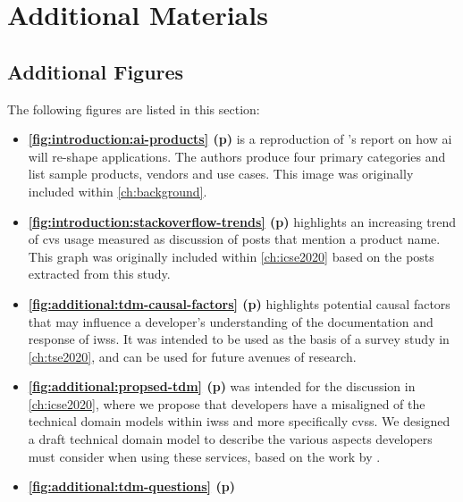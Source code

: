 \chapter{Additional Materials}
\label{ch:additional-materials}

\cleardoublepage



\clearpage

\section{Additional Figures}

The following figures are listed in this section:

\begin{itemize}
\item \textbf{\cref{fig:introduction:ai-products} (p\pageref{fig:introduction:ai-products})}
  is a reproduction of \citet{LoGiudice:2016wf}'s report on how \gls{ai} will re-shape applications. The authors produce four primary categories and list sample products, vendors and use cases. This image was originally included within \cref{ch:background}.
\item \textbf{\cref{fig:introduction:stackoverflow-trends} (p\pageref{fig:introduction:stackoverflow-trends})}
  highlights an increasing trend of \gls{cvs} usage measured as discussion of posts that mention a product name. This graph was originally included within \cref{ch:icse2020} based on the posts extracted from this study.
\item \textbf{\cref{fig:additional:tdm-causal-factors} (p\pageref{fig:additional:tdm-causal-factors})}
  highlights potential causal factors that may influence a developer's understanding of the documentation and response of \glspl{iws}. It was intended to be used as the basis of a survey study in \cref{ch:tse2020}, and can be used for future avenues of research.
\item \textbf{\cref{fig:additional:propsed-tdm} (p\pageref{fig:additional:propsed-tdm})}
  was intended for the discussion in \cref{ch:icse2020}, where we propose that developers have a misaligned of the technical domain models within \glspl{iws} and more specifically \glspl{cvs}. We designed a draft technical domain model to describe the various aspects developers must consider when using these services, based on the work by \citet{Barnett:2018Kx}. 
\item \textbf{\cref{fig:additional:tdm-questions} (p\pageref{fig:additional:tdm-questions})}

\end{itemize}
